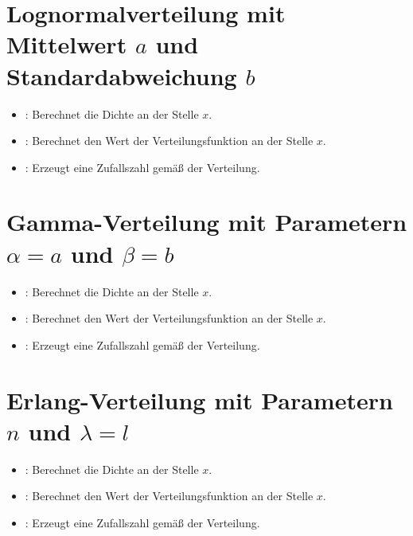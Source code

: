 \section{Lognormalverteilung mit Mittelwert \texorpdfstring{$a$}{a} und Standardabweichung \texorpdfstring{$b$}{b}}

\begin{itemize}

\item
{}:
Berechnet die Dichte an der Stelle $x$.

\item
{}:
Berechnet den Wert der Verteilungsfunktion an der Stelle $x$.

\item
{}:
Erzeugt eine Zufallszahl gemäß der Verteilung.

\end{itemize}



\section{Gamma-Verteilung mit Parametern \texorpdfstring{$\alpha=a$}{a} und \texorpdfstring{$\beta=b$}{b}}

\begin{itemize}

\item
{}:
Berechnet die Dichte an der Stelle $x$.

\item
{}:
Berechnet den Wert der Verteilungsfunktion an der Stelle $x$.

\item
{}:
Erzeugt eine Zufallszahl gemäß der Verteilung.
\end{itemize}



\section{Erlang-Verteilung mit Parametern \texorpdfstring{$n$}{n} und \texorpdfstring{$\lambda=l$}{l}}

\begin{itemize}

\item
{}:
Berechnet die Dichte an der Stelle $x$.

\item
{}:
Berechnet den Wert der Verteilungsfunktion an der Stelle $x$.

\item
{}:
Erzeugt eine Zufallszahl gemäß der Verteilung.

\end{itemize}



